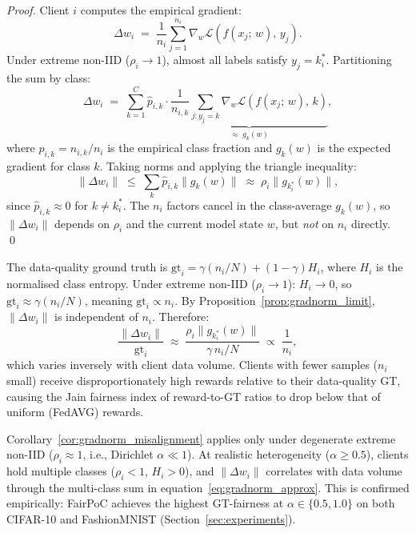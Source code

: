 \begin{proof}
Client $i$ computes the empirical gradient:
\[
  \Delta w_i \;=\; \frac{1}{n_i}
    \sum_{j=1}^{n_i} \nabla_w \mathcal{L}(f(x_j;\,w),\,y_j).
\]
Under extreme non-IID ($\rho_i \to 1$), almost all labels satisfy
$y_j = k_i^*$.
Partitioning the sum by class:
\[
  \Delta w_i \;=\;
    \sum_{k=1}^{C} \hat{p}_{i,k} \cdot
    \underbrace{\frac{1}{n_{i,k}} \sum_{j: y_j=k}
    \nabla_w \mathcal{L}(f(x_j;\,w),\,k)}_{\approx\; g_k(w)},
\]
where $\hat{p}_{i,k} = n_{i,k}/n_i$ is the empirical class fraction
and $g_k(w)$ is the expected gradient for class $k$.
Taking norms and applying the triangle inequality:
\[
  \|\Delta w_i\| \;\leq\;
    \sum_{k} \hat{p}_{i,k} \|g_k(w)\|
  \;\approx\; \rho_i \|g_{k_i^*}(w)\|,
\]
since $\hat{p}_{i,k} \approx 0$ for $k \neq k_i^*$.
The $n_i$ factors cancel in the class-average $g_k(w)$,
so $\|\Delta w_i\|$ depends on $\rho_i$ and the current model
state $w$, but \emph{not} on $n_i$ directly. \qed
\end{proof}

\begin{corollary}
\label{cor:gradnorm_misalignment}
The data-quality ground truth is
$\mathrm{gt}_i = \gamma (n_i/N) + (1-\gamma) H_i$,
where $H_i$ is the normalised class entropy.
Under extreme non-IID ($\rho_i \to 1$):
$H_i \to 0$, so $\mathrm{gt}_i \approx \gamma (n_i / N)$,
meaning $\mathrm{gt}_i \propto n_i$.
By Proposition~\ref{prop:gradnorm_limit}, $\|\Delta w_i\|$ is
independent of $n_i$.
Therefore:
\[
  \frac{\|\Delta w_i\|}{\mathrm{gt}_i}
  \;\approx\;
  \frac{\rho_i \|g_{k_i^*}(w)\|}{\gamma\, n_i/N}
  \;\propto\; \frac{1}{n_i},
\]
which varies inversely with client data volume.
Clients with fewer samples ($n_i$ small) receive
disproportionately high rewards relative to their data-quality GT,
causing the Jain fairness index of reward-to-GT ratios to drop
below that of uniform (FedAVG) rewards.
\end{corollary}

\begin{remark}
Corollary~\ref{cor:gradnorm_misalignment} applies only under
degenerate extreme non-IID ($\rho_i \approx 1$, i.e.,
Dirichlet $\alpha \ll 1$).
At realistic heterogeneity ($\alpha \geq 0.5$), clients hold
multiple classes ($\rho_i < 1$, $H_i > 0$), and $\|\Delta w_i\|$
correlates with data volume through the multi-class sum in
equation~\eqref{eq:gradnorm_approx}.
This is confirmed empirically: FairPoC achieves the highest
GT-fairness at $\alpha \in \{0.5, 1.0\}$ on both CIFAR-10 and
FashionMNIST (Section~\ref{sec:experiments}).
\end{remark}
